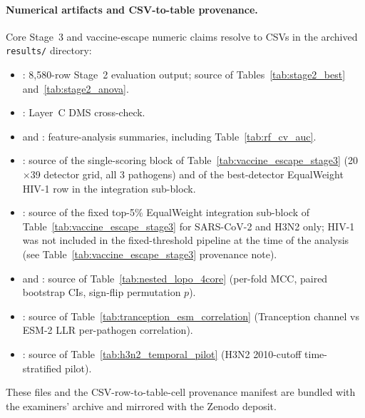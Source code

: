 \paragraph{Numerical artifacts and CSV-to-table provenance.}
Core Stage~3 and vaccine-escape numeric claims resolve to CSVs in the archived \texttt{results/} directory:
\begin{itemize}[leftmargin=*,itemsep=0pt]
\item {}: 8{,}580-row Stage~2 evaluation output; source of Tables~\ref{tab:stage2_best} and~\ref{tab:stage2_anova}.
\item {}: Layer~C DMS cross-check.
\item {} and : feature-analysis summaries, including Table~\ref{tab:rf_cv_auc}.
\item {}: source of the single-scoring block of Table~\ref{tab:vaccine_escape_stage3} (20$\times$39 detector grid, all 3 pathogens) and of the best-detector EqualWeight HIV-1 row in the integration sub-block.
\item {}: source of the fixed top-5\% EqualWeight integration sub-block of Table~\ref{tab:vaccine_escape_stage3} for SARS-CoV-2 and H3N2 only; HIV-1 was not included in the fixed-threshold pipeline at the time of the analysis (see Table~\ref{tab:vaccine_escape_stage3} provenance note).
\item {} and : source of Table~\ref{tab:nested_lopo_4core} (per-fold MCC, paired bootstrap CIs, sign-flip permutation $p$).
\item {}: source of Table~\ref{tab:tranception_esm_correlation} (Tranception channel vs ESM-2 LLR per-pathogen correlation).
\item {}: source of Table~\ref{tab:h3n2_temporal_pilot} (H3N2 2010-cutoff time-stratified pilot).
\end{itemize}
These files and the CSV-row-to-table-cell provenance manifest are bundled with the examiners' archive and mirrored with the Zenodo deposit.
